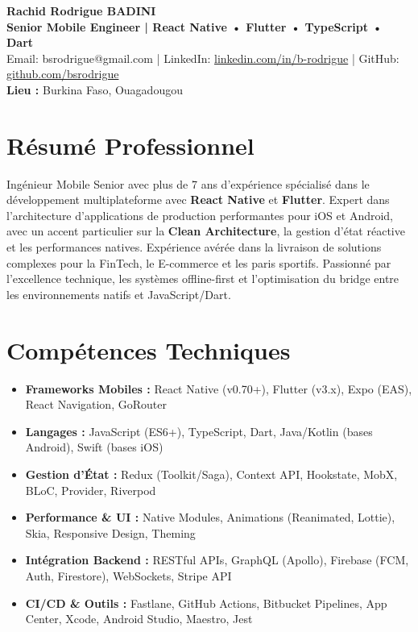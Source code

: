 \documentclass[a4paper,10pt]{article}
\begin{document}
\begin{center}
    {\LARGE\bfseries Rachid Rodrigue BADINI} \\[0.15cm]
    \textbf{Senior Mobile Engineer | React Native • Flutter • TypeScript • Dart} \\
    Email: bsrodrigue@gmail.com | LinkedIn: \href{https://linkedin.com/in/b-rodrigue}{linkedin.com/in/b-rodrigue} | GitHub: \href{https://github.com/bsrodrigue}{github.com/bsrodrigue} \\
    \textbf{Lieu :} Burkina Faso, Ouagadougou
\end{center}

\vspace{0.1cm}

\section*{Résumé Professionnel}
Ingénieur Mobile Senior avec plus de 7 ans d'expérience spécialisé dans le développement multiplateforme avec \textbf{React Native} et \textbf{Flutter}. Expert dans l'architecture d'applications de production performantes pour iOS et Android, avec un accent particulier sur la \textbf{Clean Architecture}, la gestion d'état réactive et les performances natives. Expérience avérée dans la livraison de solutions complexes pour la FinTech, le E-commerce et les paris sportifs. Passionné par l'excellence technique, les systèmes offline-first et l'optimisation du bridge entre les environnements natifs et JavaScript/Dart.

\section*{Compétences Techniques}
\begin{itemize}[leftmargin=*,nosep]
    \item \textbf{Frameworks Mobiles :} React Native (v0.70+), Flutter (v3.x), Expo (EAS), React Navigation, GoRouter
    \item \textbf{Langages :} JavaScript (ES6+), TypeScript, Dart, Java/Kotlin (bases Android), Swift (bases iOS)
    \item \textbf{Gestion d'État :} Redux (Toolkit/Saga), Context API, Hookstate, MobX, BLoC, Provider, Riverpod
    \item \textbf{Performance \& UI :} Native Modules, Animations (Reanimated, Lottie), Skia, Responsive Design, Theming
    \item \textbf{Intégration Backend :} RESTful APIs, GraphQL (Apollo), Firebase (FCM, Auth, Firestore), WebSockets, Stripe API
    \item \textbf{CI/CD \& Outils :} Fastlane, GitHub Actions, Bitbucket Pipelines, App Center, Xcode, Android Studio, Maestro, Jest
\end{itemize}
\end{document}
